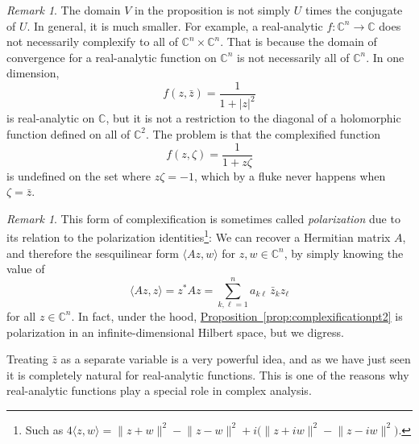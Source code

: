 \documentclass[12pt,openany]{book}
\newcommand{\linnprod}[2]{\langle #1 , #2 \rangle}
\newcommand{\sabs}[1]{\lvert {#1} \rvert}
\newcommand{\snorm}[1]{\lVert {#1} \rVert}
\newcommand{\C}{{\mathbb{C}}}
\newcommand{\myindex}[1]{#1\index{#1}}
\theoremstyle{plain}
\theoremstyle{remark}
\newtheorem{remark}[thm]{Remark}
\theoremstyle{definition}
\theoremstyle{exercise}
\theoremstyle{example}
\newcommand{\propref}[1]{\hyperref[#1]{Proposition~\ref*{#1}}}
\begin{document}
\begin{remark}
The domain $V$ in the proposition is not simply $U$ times the conjugate of $U$.
In general, it is much smaller.  For example, a real-analytic $f \colon \C^n \to
\C$ does not necessarily complexify to all of $\C^n \times \C^n$.
That is
because the domain of convergence for a real-analytic function on $\C^n$
is not necessarily all of $\C^n$.  In one dimension,
\begin{equation*}
f(z,\bar{z})
= \frac{1}{1+\sabs{z}^2}
\end{equation*}
is real-analytic on $\C$, but it is not a restriction to the diagonal
of a holomorphic function defined on all of $\C^2$.  The problem is that the complexified
function
\begin{equation*}
f(z,\zeta)
= \frac{1}{1+z \zeta}
\end{equation*}
is undefined on the set where $z \zeta = -1$, which by a fluke
never happens when $\zeta = \bar{z}$.
\end{remark}

\begin{remark}
This form of complexification is sometimes called
\emph{\myindex{polarization}} due to its relation to the polarization
identities\footnote{Such as $4 \linnprod{z}{w} =
\snorm{z+w}^2-\snorm{z-w}^2 +i \bigl( \snorm{z+iw}^2 - \snorm{z-iw}^2
\bigr)$.}:  We can recover a Hermitian matrix $A$,
and therefore the sesquilinear form $\linnprod{Az}{w}$ for
$z,w\in \C^n$, by simply knowing the value of
\begin{equation*}
\linnprod{Az}{z} = z^*Az = \sum_{k,\ell=1}^n a_{k\ell} \, \bar{z}_k z_\ell
\end{equation*}
for all $z \in \C^n$.  In fact, under the hood, \propref{prop:complexificationpt2} is
polarization in an infinite-dimensional Hilbert space, but we digress.
\end{remark}

Treating $\bar{z}$ as a separate variable is a very powerful idea, and
as we have just seen it is completely natural for
real-analytic functions.  This is one of the reasons why real-analytic
functions play a special role in complex analysis.
\end{document}
